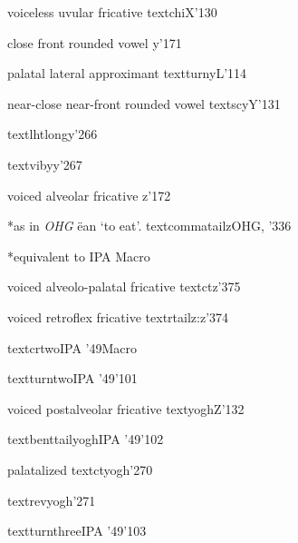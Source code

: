 %
  {voiceless uvular fricative}%
  {\tbs textchi}{X}{\ipaall}{'130}

%
  {close front rounded vowel}%
  {y}{}{\ipaall}{'171}

%
  {palatal lateral approximant}%
  {\tbs textturny}{L}{\ipaall}{'114}

%
  {near-close near-front rounded vowel}%
  {\tbs textscy}{Y}{\ipaall}{'131}

%
  {}%
  {\tbs textlhtlongy}{}{\PSG}{'266}%

%
  {}%
  {\tbs textvibyy}{}{\PSG}{'267}%

%
  {voiced alveolar fricative}%
  {z}{}{\ipaall}{'172}

%
  {*as in \emph{OHG} \"e\textcommatailz\textcommatailz an `to eat'.}%
  {\tbs textcommatailz}{}{OHG, \PSG}{'336}

%
  {*equivalent to IPA \textyogh}%
  {}{}{\PSG}{Macro}

%
  {voiced alveolo-palatal fricative}%
  {\tbs textctz}{}{\ipaall}{'375}

%
  {voiced retroflex fricative}%
  {\tbs textrtailz}{\tbs:z}{\ipaall}{'374}

%
  {}%
  {\tbs textcrtwo}{}{IPA '49}{Macro}

%
  {}%
  {\tbs textturntwo}{}{IPA '49}{'101}

%
  {voiced postalveolar fricative}%
  {\tbs textyogh}{Z}{\ipaall}{'132}%

%
  {}%
  {\tbs textbenttailyogh}{}{IPA '49}{'102}

%
  {palatalized \textyogh}%
  {\tbs textctyogh}{}{\ipaold}{'270}

%
  {}%
  {\tbs textrevyogh}{}{\PSG}{'271}

%
  {}%
  {\tbs textturnthree}{}{IPA '49}{'103}

